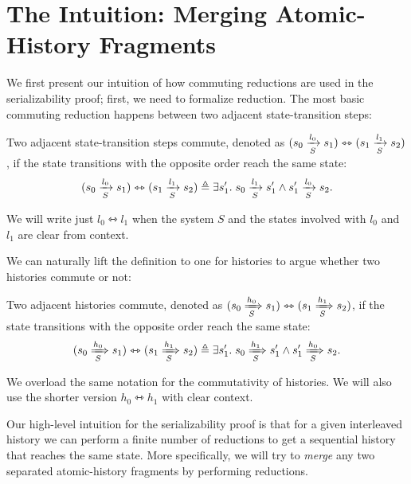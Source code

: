 \section{The Intuition: Merging Atomic-History Fragments}
\label{sec-sz-pf-intuition}

\newcommand{\commstep}[2]{\ensuremath{#1 \leftrightarrowtriangle #2}}
\newcommand{\commhst}[2]{\ensuremath{#1 \leftrightarrowtriangle #2}}

We first present our intuition of how commuting reductions are used in the serializability proof; first, we need to formalize reduction.
The most basic commuting reduction happens between two adjacent state-transition steps:
\begin{definition}
  \label{def-comm-steps}
  Two adjacent state-transition steps commute, denoted as \commstep{(\semstep{S}{s_0}{l_0}{s_1})}{(\semstep{S}{s_1}{l_1}{s_2})}, if the state transitions with the opposite order reach the same state:
  \begin{displaymath}
    \commstep{(\semstep{S}{s_0}{l_0}{s_1})}{(\semstep{S}{s_1}{l_1}{s_2})} \triangleq \exists s_1'.\; \semstep{S}{s_0}{l_1}{s_1'} \wedge \semstep{S}{s_1'}{l_0}{s_2}.
  \end{displaymath}
\end{definition}
We will write just $\commstep{l_0}{l_1}$ when the system $S$ and the states involved with $l_0$ and $l_1$ are clear from context.

We can naturally lift the definition to one for histories to argue whether two histories commute or not:
\begin{definition}
  \label{def-comm-hsts}
  Two adjacent histories commute, denoted as \commhst{(\semsteps{S}{s_0}{h_0}{s_1})}{(\semsteps{S}{s_1}{h_1}{s_2})}, if the state transitions with the opposite order reach the same state:
  \begin{displaymath}
    \commhst{(\semsteps{S}{s_0}{h_0}{s_1})}{(\semsteps{S}{s_1}{h_1}{s_2})} \triangleq \exists s_1'.\; \semsteps{S}{s_0}{h_1}{s_1'} \wedge \semsteps{S}{s_1'}{h_0}{s_2}.
  \end{displaymath}
\end{definition}
We overload the same notation for the commutativity of histories.
We will also use the shorter version $\commhst{h_0}{h_1}$ with clear context.

Our high-level intuition for the serializability proof is that for a given interleaved history we can perform a finite number of reductions to get a sequential history that reaches the same state.
More specifically, we will try to \emph{merge} any two separated atomic-history fragments by performing reductions.

